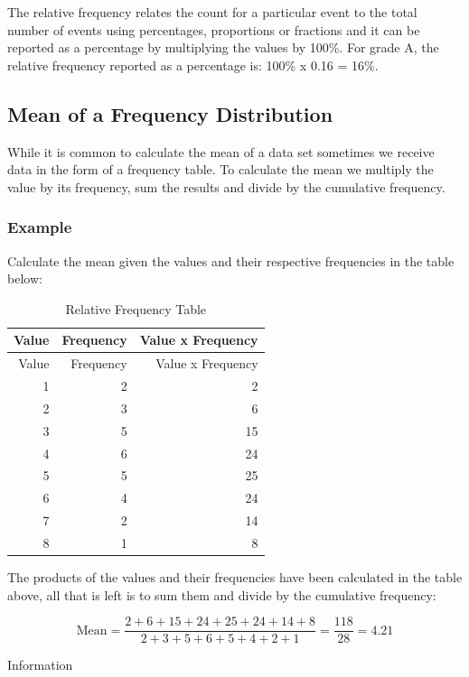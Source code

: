 \documentclass[
]{book}
\begin{document}
The relative frequency relates the count for a particular event to the total number of events using percentages, proportions or fractions and it can be reported as a percentage by multiplying the values by 100\%. For grade A, the relative frequency reported as a percentage is: 100\% x 0.16 = 16\%.

\hypertarget{mean-of-a-frequency-distribution}{%
\subsection{Mean of a Frequency Distribution}\label{mean-of-a-frequency-distribution}}

While it is common to calculate the mean of a data set sometimes we receive data in the form of a frequency table. To calculate the mean we multiply the value by its frequency, sum the results and divide by the cumulative frequency.

\hypertarget{example-6}{%
\subsubsection{Example}\label{example-6}}

Calculate the mean given the values and their respective frequencies in the table below:

\begin{longtable}[]{@{}rrr@{}}
\caption{\label{tab:table07}Relative Frequency Table}\tabularnewline
\toprule
Value & Frequency & Value x Frequency \\
\midrule
\endfirsthead
\toprule
Value & Frequency & Value x Frequency \\
\midrule
\endhead
1 & 2 & 2 \\
2 & 3 & 6 \\
3 & 5 & 15 \\
4 & 6 & 24 \\
5 & 5 & 25 \\
6 & 4 & 24 \\
7 & 2 & 14 \\
8 & 1 & 8 \\
\bottomrule
\end{longtable}

The products of the values and their frequencies have been calculated in the table above, all that is left is to sum them and divide by the cumulative frequency:

\[ \textrm{Mean}=\frac{2+6+15+24+25+24+14+8}{2+3+5+6+5+4+2+1}=\frac{118}{28}=4.21 \]

Information
\end{document}
